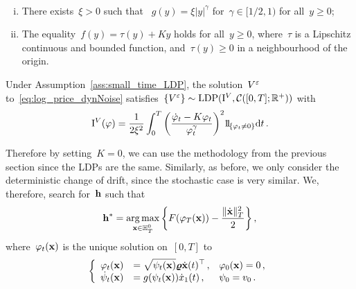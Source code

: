 \begin{assumption}\label{ass:small_time_LDP}\
\begin{enumerate}[(i)]
	\item There exists~$\xi>0$ such that ~$g(y)=\xi |y|^\gamma$ for~$\gamma \in[1 / 2,1)$ for all~$y\geq0$;
	\item The equality~$f(y)=\tau(y)+ K y$ holds for all~$y\geq0$, where~$\tau$ is a Lipschitz continuous and bounded function, and~$\tau(y) \geq 0$ in a neighbourhood of the origin.
\end{enumerate}
\end{assumption}

\begin{theorem}\label{thm:Conforti}
Under Assumption~\ref{ass:small_time_LDP}, 
the solution~$V^\varepsilon$ to~\eqref{eq:log_price_dynNoise}
satisfies~$\left\{V^{\varepsilon}\right\}\sim\mathrm{LDP}(\mathrm{I}^{V}, \mathcal{C}([0, T]; \mathbb{R}^{+}))$ with
$$
\IIV(\varphi)=\frac{1}{2 \xi^{2}} \int_{0}^{T}\left(\frac{\dot{\varphi}_{t} - K\varphi_{t}}{\varphi_{t}^{\gamma}}\right)^{2} \ind_{\left\{\varphi_{t} \neq 0\right\}} \D t\,.
$$
\end{theorem}
Therefore by setting~$K=0$, we can use the methodology from the previous section since the LDPs are the same. Similarly, as before, we only consider the deterministic change of drift, since the stochastic case is very similar.
We, therefore, search for~$\boldsymbol{\mathrm{h}}$ such that
$$
\boldsymbol{\mathrm{h}}^* = \operatorname*{arg\,max}\limits_{\boldsymbol{\mathrm{x}}\in \mathbb{H}_T^0} 
\left\{F(\varphi_T(\boldsymbol{\mathrm{x}})) - \frac{\|\dot{\boldsymbol{\mathrm{x}}}\|_{T}^2}{2}\right\},
$$
where~$\varphi_t(\boldsymbol{\mathrm{x}})$ is the unique solution on~$[0,T]$ to
\begin{equation*}
\left\{
\begin{array}{rll}
\varphi_t(\boldsymbol{\mathrm{x}}) & = \displaystyle \sqrt{\psi_t(\boldsymbol{\mathrm{x}})}\boldsymbol{\mathrm{\varrho}} \dot{\boldsymbol{\mathrm{x}}}(t)^\top\,, & \varphi_0(\boldsymbol{\mathrm{x}}) = 0\,,\\
\dot{\psi}_t(\boldsymbol{\mathrm{x}}) & =  \displaystyle g(\psi_t(\boldsymbol{\mathrm{x}})) \dot{x}_1(t)\,, & \psi_0 = v_0\,.
\end{array}
\right.
\end{equation*}



